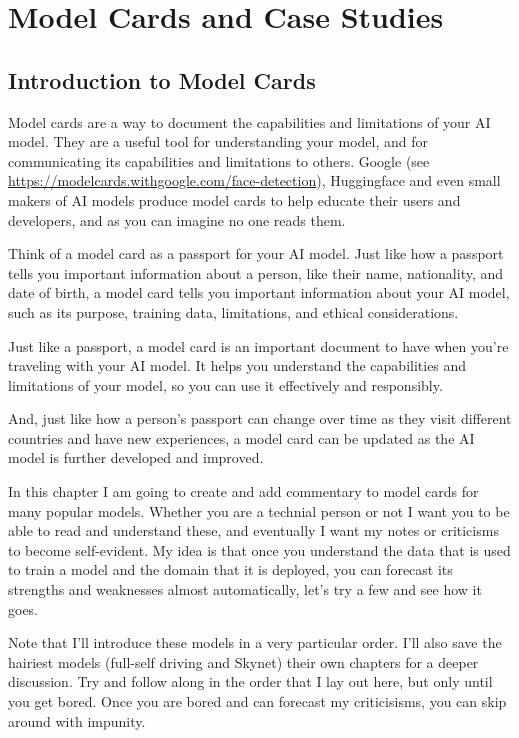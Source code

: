 \setchapterpreamble[u]{\margintoc}
\chapter{Model Cards and Case Studies}

\section{Introduction to Model Cards}

Model cards are a way to document the capabilities and limitations of your AI model. They are a useful tool for understanding your model, and for communicating its capabilities and limitations to others. Google (see \url{https://modelcards.withgoogle.com/face-detection}), Huggingface and even small makers of AI models produce model cards to help educate their users and developers, and as you can imagine no one reads them. 

Think of a model card as a passport for your AI model. Just like how a passport tells you important information about a person, like their name, nationality, and date of birth, a model card tells you important information about your AI model, such as its purpose, training data, limitations, and ethical considerations.

Just like a passport, a model card is an important document to have when you're traveling with your AI model. It helps you understand the capabilities and limitations of your model, so you can use it effectively and responsibly.

And, just like how a person's passport can change over time as they visit different countries and have new experiences, a model card can be updated as the AI model is further developed and improved.

In this chapter I am going to create and add commentary to model cards for many popular models. Whether you are a technial person or not I want you to be able to read and understand these, and eventually I want my notes or criticisms to become self-evident. My idea is that once you understand the data that is used to train a model and the domain that it is deployed, you can forecast its strengths and weaknesses almost automatically, let's try a few and see how it goes.

Note that I'll introduce these models in a very particular order. I'll also save the hairiest models (full-self driving and Skynet) their own chapters for a deeper discussion. Try and follow along in the order that I lay out here, but only until you get bored. Once you are bored and can forecast my criticisisms, you can skip around with impunity.


